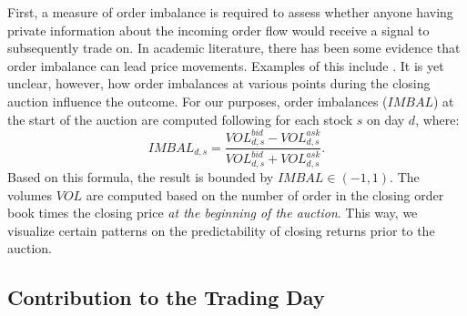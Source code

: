 \documentclass[11pt,a4paper, notitlepage]{article}
\begin{document}
	First, a measure of order imbalance is required to assess whether anyone having private information about the incoming order flow would receive a signal to subsequently trade on. In academic literature, there has been some evidence that order imbalance can lead price movements. Examples of this include \textcite{ChordiaRollSubrahmanyam2008,ChordiaRollSubrahmanyam2005}. It is yet unclear, however, how order imbalances at various points during the closing auction influence the outcome. For our purposes, order imbalances ($IMBAL$) at the start of the auction are computed following \textcite{HoldenJacobsen2014} for each stock $s$ on day $d$, where:
	\[ IMBAL_{d,s} = \frac{VOL^{bid}_{d,s} - VOL^{ask}_{d,s}}{VOL^{bid}_{d,s} + VOL^{ask}_{d,s}}. \]
	Based on this formula, the result is bounded by $IMBAL \in (-1,1)$. The volumes $VOL$ are computed based on the number of order in the closing order book times the closing price \emph{at the beginning of the auction}. This way, we visualize certain patterns on the predictability of closing returns prior to the auction.
	
	\subsection{Contribution to the Trading Day} \label{subsec:OverallDiscovery}
	
\end{document}
